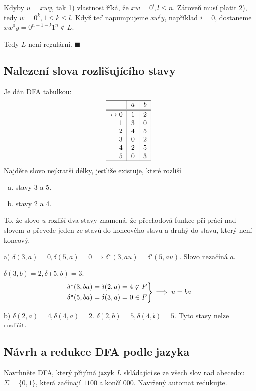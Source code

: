 Kdyby $u = xwy$, tak 1) vlastnost říká, že $xw = 0^l, l \leq n$. Zároveň musí platit 2), tedy $w = 0^k, 1 \leq k \leq l$.
Když teď napumpujeme $xw^i y$, například $i=0$, dostaneme $xw^0 y = 0^{n+1-k} 1^{n} \not\in L$.

Tedy $L$ není regulární. $\blacksquare$

\subsection{Nalezení slova rozlišujícího stavy}
Je dán DFA tabulkou:
\[
\begin{tabular}{|r|c|c|}
    \hline
    & $a$ & $b$\\
    \hline
    \hline
    $\leftrightarrow 0$& $1$ & $2$\\
    $1$                & $3$ & $0$\\
    $2$                & $4$ & $5$\\
    $3$                & $0$ & $2$\\
    $4$                & $2$ & $5$\\
    $5$                & $0$ & $3$\\
    \hline
\end{tabular}
\]
Najděte slovo nejkratší délky, jestliže existuje, které rozliší
\begin{enumerate}[a), noitemsep]
    \item stavy 3 a 5.
    \item stavy 2 a 4.
\end{enumerate}
To, že slovo $u$ rozliší dva stavy znamená, že přechodová funkce při práci nad slovem $u$ převede jeden ze stavů do 
koncového stavu a druhý do stavu, který není koncový.

a) $\delta(3,a) = 0, \delta(5,a)=0 \implies \delta^\star(3, au) = \delta^\star (5, au)$.
Slovo nezačíná $a$.

$\delta(3,b) = 2, \delta(5, b) = 3$.
\[
\begin{rcases*}
\delta^\star(3,ba) = \delta(2,a) = 4 \not\in F\\
\delta^\star(5,ba) = \delta(3,a) = 0 \in F
\end{rcases*} \implies u = ba
\]

b) $\delta(2,a) = 4, \delta(4,a) =2$. $\delta(2,b)=5, \delta(4,b)=5$. Tyto stavy nelze rozlišit.

\subsection{Návrh a redukce DFA podle jazyka}
Navrhněte DFA, který přijímá jazyk $L$ skládající se ze všech slov nad abecedou $\Sigma = \{0, 1\}$, která začínají 
$1100$ a končí $000$. Navržený automat redukujte.

